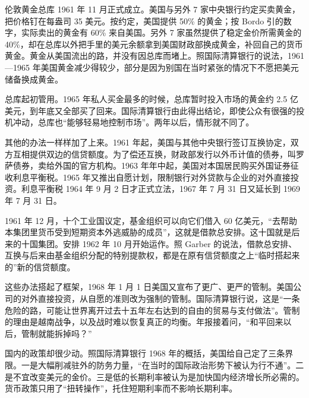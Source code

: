 伦敦黄金总库 1961 年 11 月正式成立。美国与另外 7 家中央银行约定买卖黄金，把价格钉在每盎司 35 美元\cite{bordo1993}。按约定，美国提供 50\% 的黄金\cite{garber1993}；按 Bordo 引的数字，实际卖出的黄金有 60\% 来自美国\cite{bordo1993}。另外 7 家虽然提供了稳定金价所需黄金的 40\%，却在总库以外把手里的美元余额拿到美国财政部换成黄金，补回自己的货币黄金\cite{bordo1993}。黄金从美国流出的路，并没有因总库而堵上。照国际清算银行的说法，1961—1965 年美国黄金减少得较少，部分是因为别国在当时紧张的情况下不愿把美元储备换成黄金\cite{bis36}。

总库起初管用。1965 年私人买金最多的时候，总库暂时投入市场的黄金约 2.5 亿美元，到年底又全部买了回来\cite{bis36}。国际清算银行由此得出结论，即使公众有很强的投机冲动，总库也“能够轻易地控制市场”\cite{bis36}。两年以后，情形就不同了。

其他的办法一样样加了上来。1961 年起，美国与其他中央银行签订互换协定，双方互相提供双边的信贷额度\cite{bordo1993}。为了偿还互换，财政部发行以外币计值的债券，叫罗萨债券，卖给外国的官方机构\cite{bordo1993,bis36}。1963 年年中起，美国对本国居民购买外国证券征收利息平衡税。1965 年又推出自愿计划，限制银行对外贷款与企业的对外直接投资\cite{bis36}。利息平衡税 1964 年 9 月 2 日才正式立法，1967 年 7 月 31 日又延长到 1969 年 7 月 31 日\cite{frus36}。

1961 年 12 月，十个工业国议定，基金组织可以向它们借入 60 亿美元，“去帮助本集团里货币受到短期资本外逃威胁的成员”，这就是借款总安排\cite{bis36}。这十国就是后来的十国集团。安排 1962 年 10 月开始运作\cite{garber1993}。照 Garber 的说法，借款总安排、互换与后来由基金组织分配的特别提款权，都是在原有信贷额度之上“临时搭起来的”新的信贷额度\cite{garber1993}。

这些办法搭起了框架，1968 年 1 月 1 日美国又宣布了更广、更严的管制\cite{bis36}。美国公司的对外直接投资，从自愿的准则改为强制的管制\cite{bis36}。国际清算银行说，这是“一条危险的路，可能让世界离开过去十五年左右达到的自由的贸易与支付做法”\cite{bis36}。管制的理由是越南战争，以及战时难以恢复真正的均衡。年报接着问，“和平回来以后，管制就能拆掉吗？”\cite{bis36}

国内的政策却很少动。照国际清算银行 1968 年的概括，美国给自己定了三条界限\cite{bis36}。一是大幅削减驻外的防务力量，“在当时的国际政治形势下被认为行不通”。二是不宜改变美元的金价。三是低的长期利率被认为是加快国内经济增长所必需的\cite{bis36}。货币政策只用了“扭转操作”，托住短期利率而不影响长期利率\cite{bis36}。

